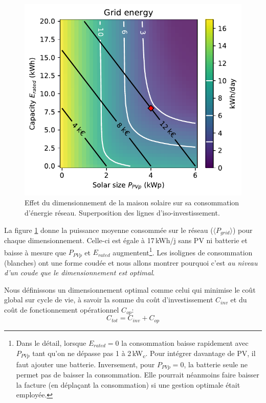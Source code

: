 \documentclass[a4paper,10pt,twocolumn]{article}
\providecommand{\avg}[1]{\langle#1\rangle}
\newcommand\sub[1]{\textsubscript{#1}}
\newcommand\kWc{kW\sub{c}{}} %
\begin{document}
\begin{figure}[!ht]
  \begin{center}
	  \includegraphics[width=0.8\columnwidth]{figures/Sizing_E_grid_invest_heatmap.pdf}
  \end{center}

  \caption{Effet du dimensionnement de la maison solaire sur sa consommation d'énergie réseau.
  Superposition des lignes d'iso-investissement.
  }
  \label{fig:P_grid_map}
\end{figure}

La figure \ref{fig:P_grid_map} donne la puissance moyenne consommée sur le réseau ($\avg{P_{grid}}$)
pour chaque dimensionnement. Celle-ci est égale à 17\,kWh/j sans PV ni batterie
et baisse à mesure que $P_{PVp}$ et $E_{rated}$ augmentent\footnote{
  Dans le détail,
  lorsque $E_{rated}=0$ la consommation baisse rapidement avec $P_{PVp}$
  tant qu'on ne dépasse pas 1 à 2\,\kWc. Pour intégrer davantage de PV,
  il faut ajouter une batterie.
  Inversement, pour $P_{PVp}=0$, la batterie seule ne permet pas de baisser la consommation.
  Elle pourrait néanmoins faire baisser la facture (en déplaçant la consommation)
  si une gestion optimale était employée.}.
Les isolignes de consommation (blanches) ont une forme coudée
et nous allons montrer pourquoi c'est \emph{au niveau d'un coude que le dimensionnement est optimal}.

Nous définissons un dimensionnement optimal comme celui qui minimise le coût global sur cycle de vie,
à savoir la somme du coût d'investissement $C_{inv}$
et du coût de fonctionnement opérationnel $C_{op}$:
%
\begin{equation} \label{eq:C_tot}
  C_{tot} = C_{inv} + C_{op}
\end{equation}
\end{document}

